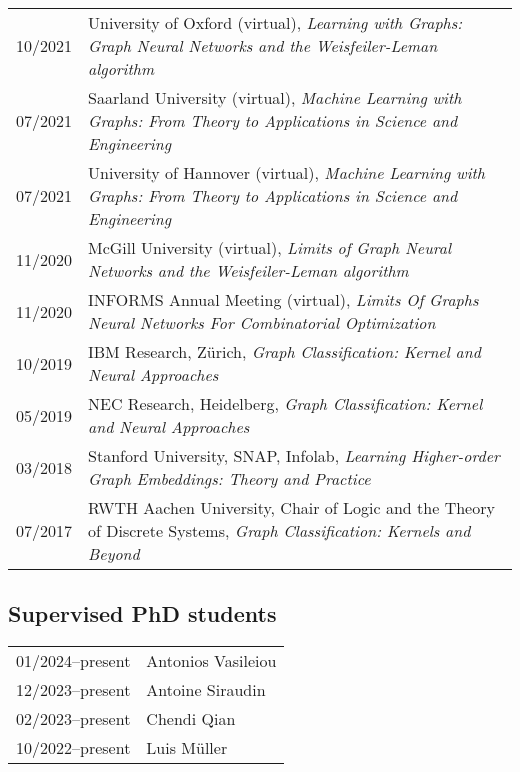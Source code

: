 \documentclass[11pt, a4paper, DIV=14, headings=small]{scrartcl}
\begin{document}
\begin{longtabu}{p{2.1cm}p{12.0cm}}
		10/2021 & University of Oxford (virtual), \emph{Learning with Graphs: Graph Neural Networks and the Weisfeiler-Leman algorithm}                                                                                                                                                         \\
		07/2021 & Saarland University (virtual), \emph{Machine Learning with Graphs: From Theory to Applications in Science and Engineering} \\
		07/2021 & University of Hannover (virtual), \emph{Machine Learning with Graphs:
			From Theory to Applications in Science and Engineering}                                                                              \\
		11/2020 & McGill University (virtual), \emph{Limits of Graph Neural Networks and the Weisfeiler-Leman algorithm}                     \\
		11/2020 & INFORMS Annual Meeting (virtual), \emph{Limits Of Graphs Neural Networks For Combinatorial Optimization}                   \\
		10/2019 & IBM Research, Zürich, \emph{Graph Classification: Kernel and Neural Approaches}                                            \\
		05/2019 & NEC Research, Heidelberg, \emph{Graph Classification: Kernel and Neural Approaches}                                        \\
		03/2018 & Stanford University, SNAP, Infolab, \emph{Learning Higher-order Graph Embeddings: Theory and Practice}                     \\
		07/2017 & RWTH Aachen University, Chair of Logic and the Theory of Discrete Systems, \emph{Graph Classification: Kernels and Beyond} \\
	\end{longtabu}
	
	\subsection*{Supervised PhD students}
	\begin{longtabu}{p{2.1cm}p{12.0cm}}
		01/2024--present & Antonios Vasileiou \\
		12/2023--present & Antoine Siraudin \\
		02/2023--present & Chendi Qian \\
		10/2022--present & Luis Müller \\
	\end{longtabu}
	
\end{document}
